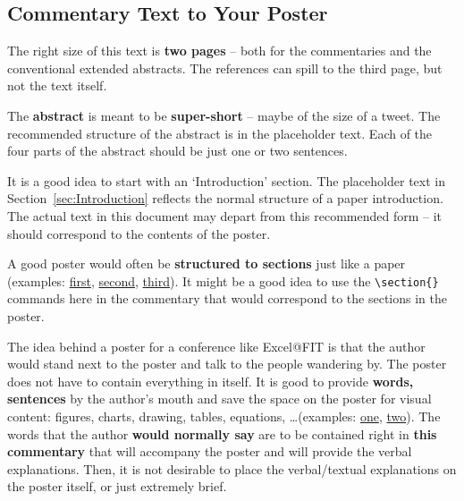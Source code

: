 \documentclass[czech]{ExcelAtFIT} %
\begin{document}
\subsection{Commentary Text to Your Poster}
\label{sec:Commentary}

The right size of this text is \textbf{two pages} -- both for the commentaries and the conventional extended abstracts.  The references can spill to the third page, but not the text itself.

The \textbf{abstract} is meant to be \textbf{super-short} -- maybe of the size of a tweet.  The recommended structure of the abstract is in the placeholder text.  Each of the four parts of the abstract should be just one or two sentences.

It is a good idea to start with an `Introduction' section.  The placeholder text in Section~\ref{sec:Introduction} reflects the normal structure of a paper introduction.  The actual text in this document may depart from this recommended form -- it should correspond to the contents of the poster.

A good poster would often be \textbf{structured to sections} just like a paper (examples: \href{https://excel.fit.vutbr.cz/submissions/2022/001/1_poster.pdf}{first}, \href{https://excel.fit.vutbr.cz/submissions/2022/002/2_poster.pdf}{second}, \href{https://excel.fit.vutbr.cz/submissions/2022/003/3_poster.pdf}{third}).  It might be a good idea to use the \verb|\section{}| commands here in the commentary that would correspond to the sections in the poster.

The idea behind a poster for a conference like Excel@FIT is that the author would stand next to the poster and talk to the people wandering by.
The poster does not have to contain everything in itself.  It is good to provide \textbf{words, sentences} by the author's mouth and save the space on the poster for visual content: figures, charts, drawing, tables, equations, \dots (examples: \href{https://excel.fit.vutbr.cz/submissions/2022/002/2_poster.pdf}{one}, \href{https://excel.fit.vutbr.cz/submissions/2022/010/10_poster.pdf}{two}).  The words that the author \textbf{would normally say} are to be contained right in \textbf{this commentary} that will accompany the poster and will provide the verbal explanations.  Then, it is not desirable to place the verbal/textual explanations on the poster itself, or just extremely brief.
\end{document}
